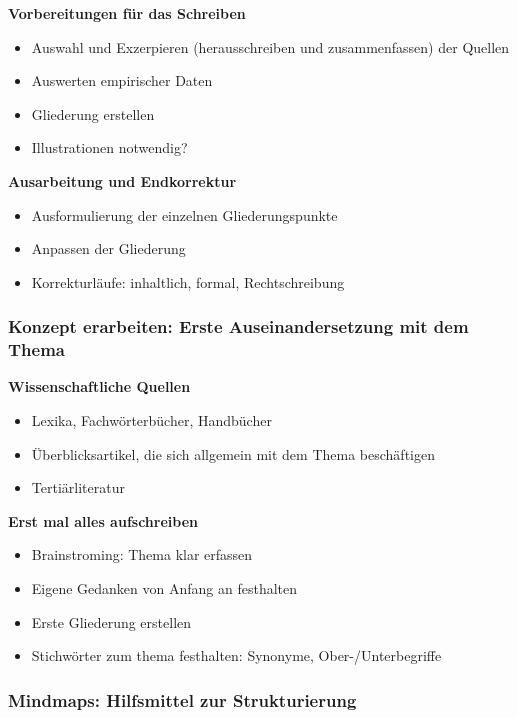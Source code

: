 \textbf{Vorbereitungen für das Schreiben}

\begin{itemize}%
\item
  Auswahl und Exzerpieren (herausschreiben und zusammenfassen) der
  Quellen
\item
  Auswerten empirischer Daten
\item
  Gliederung erstellen
\item
  Illustrationen notwendig?
\end{itemize}

\textbf{Ausarbeitung und Endkorrektur}

\begin{itemize}%
\item
  Ausformulierung der einzelnen Gliederungspunkte
\item
  Anpassen der Gliederung
\item
  Korrekturläufe: inhaltlich, formal, Rechtschreibung
\end{itemize}

\subsubsection{Konzept erarbeiten: Erste Auseinandersetzung mit dem
Thema}\label{konzept-erarbeiten-erste-auseinandersetzung-mit-dem-thema}

\textbf{Wissenschaftliche Quellen}

\begin{itemize}%
\item
  Lexika, Fachwörterbücher, Handbücher
\item
  Überblicksartikel, die sich allgemein mit dem Thema beschäftigen
\item
  Tertiärliteratur
\end{itemize}

\textbf{Erst mal alles aufschreiben}

\begin{itemize}%
\item
  Brainstroming: Thema klar erfassen
\item
  Eigene Gedanken von Anfang an festhalten
\item
  Erste Gliederung erstellen
\item
  Stichwörter zum thema festhalten: Synonyme, Ober-/Unterbegriffe
\end{itemize}

\subsubsection{Mindmaps: Hilfsmittel zur
Strukturierung}\label{mindmaps-hilfsmittel-zur-strukturierung}


